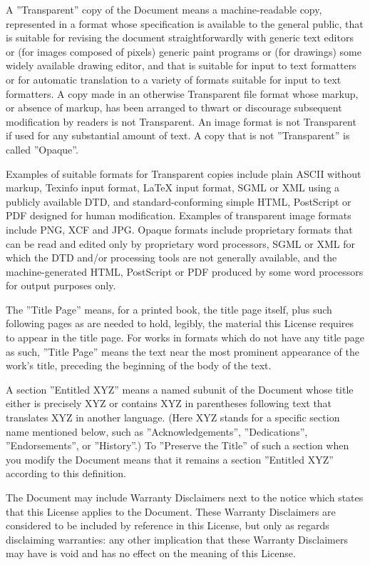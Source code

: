 A ''Transparent'' copy of the Document means a machine-readable copy, represented in a format whose specification is
available to the general public, that is suitable for revising the document straightforwardly with generic text editors
or (for images composed of pixels) generic paint programs or (for drawings) some widely available drawing editor, and
that is suitable for input to text formatters or for automatic translation to a variety of formats suitable for input
to text formatters. A copy made in an otherwise Transparent file format whose markup, or absence of markup, has been
arranged to thwart or discourage subsequent modification by readers is not Transparent. An image format is not
Transparent if used for any substantial amount of text. A copy that is not ''Transparent'' is called ''Opaque''.

Examples of suitable formats for Transparent copies include plain ASCII without markup, Texinfo input format, LaTeX
input format, SGML or XML using a publicly available DTD, and standard-conforming simple HTML, PostScript or PDF
designed for human modification. Examples of transparent image formats include PNG, XCF and JPG. Opaque formats include
proprietary formats that can be read and edited only by proprietary word processors, SGML or XML for which the DTD
and/or processing tools are not generally available, and the machine-generated HTML, PostScript or PDF produced by some
word processors for output purposes only.

The ''Title Page'' means, for a printed book, the title page itself, plus such following pages as are needed to hold,
legibly, the material this License requires to appear in the title page. For works in formats which do not have any
title page as such, ''Title Page'' means the text near the most prominent appearance of the work's title, preceding the
beginning of the body of the text.

A section ''Entitled XYZ'' means a named subunit of the Document whose title either is precisely XYZ or contains XYZ in
parentheses following text that translates XYZ in another language. (Here XYZ stands for a specific section name
mentioned below, such as ''Acknowledgements'', ''Dedications'', ''Endorsements'', or ''History''.) To ''Preserve the
Title'' of such a section when you modify the Document means that it remains a section ''Entitled XYZ'' according to
this definition.

The Document may include Warranty Disclaimers next to the notice which states that this License applies to the
Document. These Warranty Disclaimers are considered to be included by reference in this License, but only as regards
disclaiming warranties: any other implication that these Warranty Disclaimers may have is void and has no effect on the
meaning of this License.

